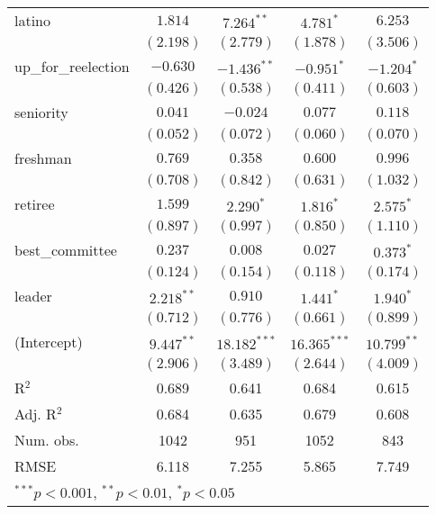 \documentclass[12pt]{article}
\begin{document}
\begin{table}
\begin{center}
\begin{tabular}{l c c c c }
			latino                 & $1.814$        & $7.264^{**}$    & $4.781^{*}$    & $6.253$       \\
			& $(2.198)$      & $(2.779)$       & $(1.878)$      & $(3.506)$     \\
			up\_for\_reelection    & $-0.630$       & $-1.436^{**}$   & $-0.951^{*}$   & $-1.204^{*}$  \\
			& $(0.426)$      & $(0.538)$       & $(0.411)$      & $(0.603)$     \\
			seniority              & $0.041$        & $-0.024$        & $0.077$        & $0.118$       \\
			& $(0.052)$      & $(0.072)$       & $(0.060)$      & $(0.070)$     \\
			freshman               & $0.769$        & $0.358$         & $0.600$        & $0.996$       \\
			& $(0.708)$      & $(0.842)$       & $(0.631)$      & $(1.032)$     \\
			retiree                & $1.599$        & $2.290^{*}$     & $1.816^{*}$    & $2.575^{*}$   \\
			& $(0.897)$      & $(0.997)$       & $(0.850)$      & $(1.110)$     \\
			best\_committee        & $0.237$        & $0.008$         & $0.027$        & $0.373^{*}$   \\
			& $(0.124)$      & $(0.154)$       & $(0.118)$      & $(0.174)$     \\
			leader                 & $2.218^{**}$   & $0.910$         & $1.441^{*}$    & $1.940^{*}$   \\
			& $(0.712)$      & $(0.776)$       & $(0.661)$      & $(0.899)$     \\
			(Intercept)            & $9.447^{**}$   & $18.182^{***}$  & $16.365^{***}$ & $10.799^{**}$ \\
			& $(2.906)$      & $(3.489)$       & $(2.644)$      & $(4.009)$     \\
			\hline
			R$^2$                  & 0.689          & 0.641           & 0.684          & 0.615         \\
			Adj. R$^2$             & 0.684          & 0.635           & 0.679          & 0.608         \\
			Num. obs.              & 1042           & 951             & 1052           & 843           \\
			RMSE                   & 6.118          & 7.255           & 5.865          & 7.749         \\
			\hline
			\multicolumn{5}{l}{\scriptsize{$^{***}p<0.001$, $^{**}p<0.01$, $^*p<0.05$}}
		\end{tabular}
	\end{center}
\end{table}
\end{document}
